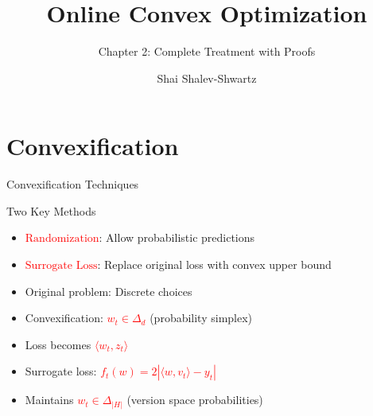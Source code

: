 \documentclass{beamer}
\title{Online Convex Optimization}
\subtitle{Chapter 2: Complete Treatment with Proofs}
\author{Shai Shalev-Shwartz}
\date{}
\newcommand{\mathred}[1]{\textcolor{red}{$#1$}} %
\begin{document}
\begin{frame}
\titlepage
\end{frame}

\section{Convexification}
\begin{frame}{Convexification Techniques}
\begin{block}{Two Key Methods}
\begin{itemize}
\item \mathred{\text{Randomization}}: Allow probabilistic predictions
\item \mathred{\text{Surrogate Loss}}: Replace original loss with convex upper bound
\end{itemize}
\end{block}

\begin{example}
\begin{itemize}
\item Original problem: Discrete choices
\item Convexification: \mathred{w_t \in \Delta_d} (probability simplex)
\item Loss becomes \mathred{\langle w_t, z_t \rangle}
\end{itemize}
\end{example}

\begin{example}
\begin{itemize}
\item Surrogate loss: \mathred{f_t(w) = 2|\langle w,v_t \rangle - y_t|}
\item Maintains \mathred{w_t \in \Delta_{|H|}} (version space probabilities)
\end{itemize}
\end{example}
\end{frame}
\end{document}
